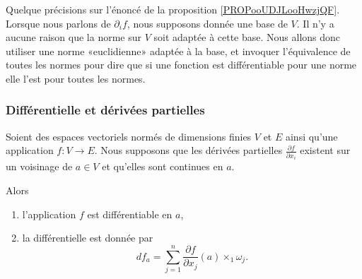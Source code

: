\begin{normaltext}      \label{NORMooDAZZooDiGFoW}
    Quelque précisions sur l'énoncé de la proposition \ref{PROPooUDJLooHwzjQF}. Lorsque nous parlons de \( \partial_if\), nous supposons donnée une base de \( V\). Il n'y a aucune raison que la norme sur \( V\) soit adaptée à cette base. Nous allons donc utiliser une norme «euclidienne» adaptée à la base, et invoquer l'équivalence de toutes les normes pour dire que si une fonction est différentiable pour une norme elle l'est pour toutes les normes.
\end{normaltext}

\subsubsection{Différentielle et dérivées partielles}

\begin{proposition}     \label{PROPooUDJLooHwzjQF}
    Soient des espaces vectoriels normés de dimensions finies \( V\) et \( E\) ainsi qu'une application \( f\colon V\to E\). Nous supposons que les dérivées partielles \( \frac{ \partial f }{ \partial x_i }\) existent sur un voisinage de \( a\in V\) et qu'elles sont continues en \( a\).
    
    Alors
    \begin{enumerate}
        \item
            l'application \( f\) est différentiable en \( a\),
        \item
            la différentielle est donnée par
            \begin{equation}
                df_a=\sum_{j=1}^n\frac{ \partial f }{ \partial x_j }(a)\times_1\omega_j.
            \end{equation}
    \end{enumerate}
\end{proposition}


